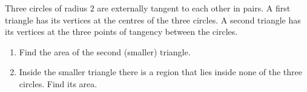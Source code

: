 Three circles of radius $2$ are externally tangent to each other in pairs. A first triangle has its vertices at the centres of the three circles. A second triangle has its vertices at the three points of tangency between the circles.
\begin{enumerate}
\item[(a)] Find the area of the second (smaller) triangle.
\item[(b)] Inside the smaller triangle there is a region that lies inside none of the three circles. Find its area.
\end{enumerate}
